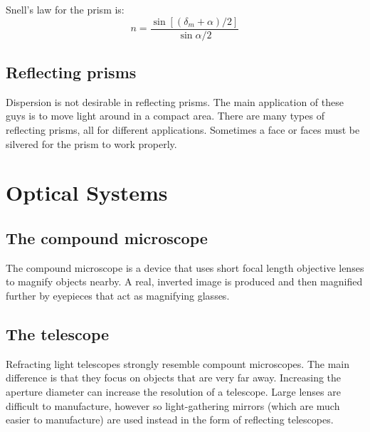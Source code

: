 \documentclass[12pt]{report}
\begin{document}
Snell's law for the prism is:
\begin{equation}
n = \frac{\sin [(\delta_m+\alpha)/2]}{\sin \alpha/2}
\end{equation}
\subsection{Reflecting prisms}
Dispersion is not desirable in reflecting prisms. The main application of these guys is to move light around in a compact area. There are many types of reflecting prisms, all for different applications. Sometimes a face or faces must be silvered for the prism to work properly. 

\section{Optical Systems}

\subsection{The compound microscope}
The compound microscope is a device that uses short focal length objective lenses to magnify objects nearby. A real, inverted image is produced and then magnified further by eyepieces that act as magnifying glasses. 


\subsection{The telescope}
Refracting light telescopes strongly resemble compount microscopes. The main difference is that they focus on objects that are very far away. Increasing the aperture diameter can increase the resolution of a telescope. Large lenses are difficult to manufacture, however so light-gathering mirrors (which are much easier to manufacture) are used instead in the form of reflecting telescopes. 
\end{document}
